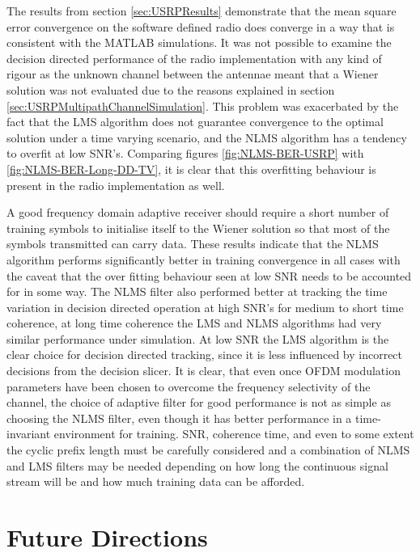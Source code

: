 The results from section \ref{sec:USRPResults} demonstrate that %
the mean square error convergence on the software defined %
radio does converge in a way that is consistent with the MATLAB %
simulations. It was not possible to examine the decision directed %
performance of the radio implementation with any kind of rigour %
as the unknown channel between the antennae meant that %
a Wiener solution was not evaluated due to the reasons explained in %
section \ref{sec:USRPMultipathChannelSimulation}. This problem was %
exacerbated by the fact that the LMS algorithm does not guarantee %
convergence to the optimal solution under a time varying scenario, and %
the NLMS algorithm has a tendency to overfit at low SNR's. Comparing figures %
\ref{fig:NLMS-BER-USRP} with \ref{fig:NLMS-BER-Long-DD-TV}, it is %
clear that this overfitting behaviour is present in the radio implementation %
as well.

A good frequency domain adaptive receiver should require a short %
number of training symbols to initialise itself to the Wiener solution so that %
most of the symbols transmitted can carry data. These results indicate %
that the NLMS algorithm performs significantly better in training convergence %
in all cases with the caveat that the over fitting behaviour seen %
at low SNR needs to be accounted for in some way. The NLMS filter %
also performed better at tracking the time variation in decision directed %
operation at high SNR's for medium to short time coherence, at long %
time coherence the LMS and NLMS algorithms had very similar performance %
under simulation. At low SNR the LMS algorithm is the clear choice %
for decision directed tracking, since it is less influenced by incorrect %
decisions from the decision slicer. It is clear, that even once OFDM %
modulation parameters have been chosen to overcome the %
frequency selectivity of the channel, the choice of adaptive %
filter for good performance is not as simple as choosing the %
NLMS filter, even though it has better performance in a %
time-invariant environment for training. SNR, coherence time, %
and even to some extent the cyclic prefix length must be %
carefully considered and a combination of NLMS and LMS %
filters may be needed depending on how long the continuous %
signal stream will be and how much training data can %
be afforded.

\section{Future Directions}

